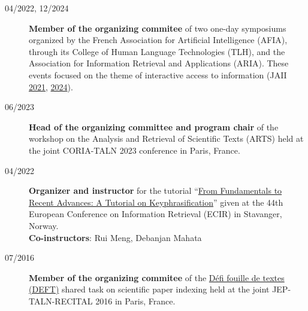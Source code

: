 \begin{description}

    \item[04/2022, 12/2024] \textbf{Member of the organizing commitee} of two one-day symposiums organized by the French Association for Artificial Intelligence (AFIA), through its College of Human Language Technologies (TLH), and the Association for Information Retrieval and Applications (ARIA). These events focused on the theme of interactive access to information (JAII \href{https://jaii2021.sciencesconf.org/}{2021}, \href{https://jaii2024.sciencesconf.org/}{2024}).

    \item[06/2023] \textbf{Head of the organizing committee and program chair} of the workshop on the Analysis and Retrieval of Scientific Texts (ARTS) held at the joint CORIA-TALN 2023 conference in Paris, France.

    \item[04/2022] \textbf{Organizer and instructor} for the tutorial ``\href{https://keyphrasification.github.io/}{From Fundamentals to Recent Advances: A Tutorial on Keyphrasification}'' given at the 44th European Conference on Information Retrieval (ECIR) in Stavanger, Norway. \\
    \textbf{Co-instructors}: Rui Meng, Debanjan Mahata

    \item[07/2016] \textbf{Member of the organizing commitee} of the \href{https://talnarchives.atala.org/ateliers/2016/DEFT/1.pdf}{Défi fouille de textes (DEFT)} shared task on scientific paper indexing held at the joint JEP-TALN-RECITAL 2016 in Paris, France.


\end{description}
